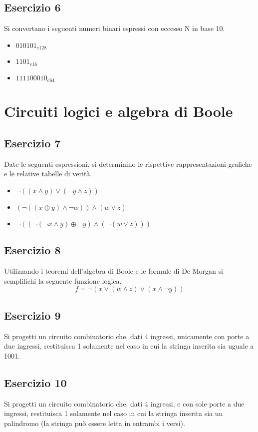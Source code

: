 \documentclass{article}
\newcommand*\xor{\oplus}
\begin{document}
\subsection*{Esercizio 6}
Si convertano i seguenti numeri binari espressi con eccesso N in base 10.
\begin{itemize}
\item ${010101}_{e128}$
\item ${1101}_{e16}$
\item ${111100010}_{e64}$
\end{itemize}

\section*{Circuiti logici e algebra di Boole}
\subsection*{Esercizio 7}
Date le seguenti espressioni, si determinino le rispettive rappresentazioni grafiche e le relative tabelle di verità.
\begin{itemize}
\item $\neg((x \land y) \lor (\neg y \land z))$
\item $(\neg((x \xor y) \land \neg w)) \land (w \lor z)$
\item $\neg((\neg (\neg x \land y) \xor \neg y) \land (\neg(w \lor z)))$

\end{itemize}

\subsection*{Esercizio 8}
Utilizzando i teoremi dell'algebra di Boole e le formule di De Morgan si semplifichi la seguente funzione logica.
\[
f = \neg(x \lor (w \land z) \lor (x \land \neg y))
\]

\subsection*{Esercizio 9}
Si progetti un circuito combinatorio che, dati 4 ingressi, unicamente con porte a due ingressi, restituisca 1 solamente nel caso in cui la stringa inserita sia uguale a 1001.

\subsection*{Esercizio 10}
Si progetti un circuito combinatorio che, dati 4 ingressi, e con sole porte a due ingressi, restituisca 1 solamente nel caso in cui la stringa inserita sia un palindromo (la stringa può essere letta in entrambi i versi).
\end{document}
